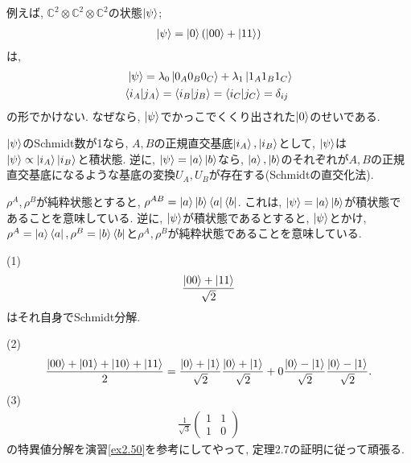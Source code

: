 \begin{ex}
    \label{ex2.77}
    例えば, $\mathbb{C}^2 \otimes \mathbb{C}^2 \otimes \mathbb{C}^2$の状態$\ket{\psi}$;
    \begin{align*}
        \ket{\psi}= \ket{0} \left( {\ket{00} + \ket{11}}\right)
    \end{align*}
    は,
    \begin{align*}
        \ket{\psi}
        =
        \lambda_0 \ket{0_{A}{0_{B}}{0_{C}}}
        +
        \lambda_1 \ket{1_{A}{1_{B}}{1_{C}} } \\
        \braket{i_{A} | j_{A}} = \braket{i_{B} | j_{B}} = \braket{i_{C} | j_{C}} = \delta_{ij} \
    \end{align*}
    の形でかけない. なぜなら, $\ket{\psi}$でかっこでくくり出された$\ket{0}$のせいである.
\end{ex}

\begin{ex}
    \label{ex2.78}
    $\ket{\psi}$のSchmidt数が1なら, $A,B$の正規直交基底$\ket{i_A}, \ket{i_B}$として, $\ket{\psi}$は$\ket{ \psi } \propto \ket{i_A} \ket{i_B}$と積状態.
    逆に, $\ket{ \psi } = \ket{a} \ket{b}$なら, $\ket{a}, \ket{b}$のそれぞれが$A,B$の正規直交基底になるような基底の変換$U_A,U_B$が存在する(Schmidtの直交化法).
    \par
    $\rho^A, \rho^B$が純粋状態とすると, $\rho^{AB} = \ket{a}\ket{b} \bra{a}\bra{b}$. これは, $\ket{\psi}=\ket{a}\ket{b}$が積状態であることを意味している. 逆に, $\ket{\psi}$が積状態であるとすると, $\ket{\psi}$とかけ, $\rho^A = \ket{a} \bra{a}, \rho^B = \ket{b} \bra{b}$と$\rho^A, \rho^B$が純粋状態であることを意味している.
\end{ex}

\begin{ex}
    \label{ex2.79}
    (1)\
    \begin{align*}
        \frac{\ket{00} + \ket{11}}{\sqrt{2}}
    \end{align*}
    はそれ自身でSchmidt分解.
    \par
    (2)\
    \begin{align*}
        \frac{\ket{00}+\ket{01}+\ket{10}+\ket{11}}{2} = \frac{\ket{0} + \ket{1}}{\sqrt{2}} \frac{\ket{0} + \ket{1}}{\sqrt{2}} + 0 \frac{\ket{0} - \ket{1}}{\sqrt{2}} \frac{\ket{0} - \ket{1}}{\sqrt{2}} .
    \end{align*}
    (3)\
    \begin{align*}
        \frac{1}{\sqrt{3}}
        \begin{pmatrix}
            1 & 1 \\
            1 & 0
        \end{pmatrix}
    \end{align*}
    の特異値分解を演習\ref{ex2.50}を参考にしてやって, 定理2.7の証明に従って頑張る.
\end{ex}

